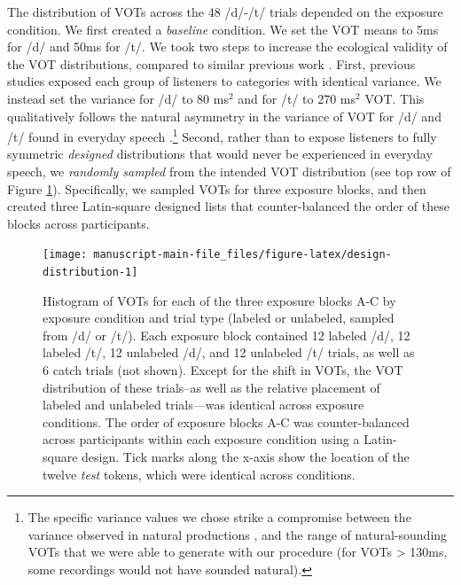\documentclass[
  11pt,
  man,mask,floatsintext]{apa6}
\begin{document}
The distribution of VOTs across the 48 /d/-/t/ trials depended on the exposure condition. We first created a \emph{baseline} condition. We set the VOT means to 5ms for /d/ and 50ms for /t/. We took two steps to increase the ecological validity of the VOT distributions, compared to similar previous work \autocite{clayards2008,idemaru-holt2011,idemaru-holt2020,kleinschmidt2015,kleinschmidt2020}. First, previous studies exposed each group of listeners to categories with identical variance. We instead set the variance for /d/ to 80 ms\(^2\) and for /t/ to 270 ms\(^2\) VOT. This qualitatively follows the natural asymmetry in the variance of VOT for /d/ and /t/ found in everyday speech \autocite{lisker-abramson1964,docherty1992,chodroff-wilson2017}.\footnote{The specific variance values we chose strike a compromise between the variance observed in natural productions \autocite[e.g, mean by-talker variances of 29 ms\(^2\) for /d/ and 275 ms\(^2\) for /t/ in hyper-articulated isolated word productions, and 70 ms\(^2\) for /d/ and 410 ms\(^2\) for /t/ in connected speech,][]{chodroff-wilson2017}, and the range of natural-sounding VOTs that we were able to generate with our procedure (for VOTs \textgreater{} 130ms, some recordings would not have sounded natural).} Second, rather than to expose listeners to fully symmetric \emph{designed} distributions that would never be experienced in everyday speech, we \emph{randomly sampled} from the intended VOT distribution (see top row of Figure \ref{fig:design-distribution}). Specifically, we sampled VOTs for three exposure blocks, and then created three Latin-square designed lists that counter-balanced the order of these blocks across participants.



\begin{figure}

{\centering \texttt{[image: manuscript-main-file\_files/figure-latex/design-distribution-1]} 

}

\caption{Histogram of VOTs for each of the three exposure blocks A-C by exposure condition and trial type (labeled or unlabeled, sampled from /d/ or /t/). Each exposure block contained 12 labeled /d/, 12 labeled /t/, 12 unlabeled /d/, and 12 unlabeled /t/ trials, as well as 6 catch trials (not shown). Except for the shift in VOTs, the VOT distribution of these trials--as well as the relative placement of labeled and unlabeled trials---was identical across exposure conditions. The order of exposure blocks A-C was counter-balanced across participants within each exposure condition using a Latin-square design. Tick marks along the x-axis show the location of the twelve \emph{test} tokens, which were identical across conditions.}\label{fig:design-distribution}
\end{figure}
\end{document}
